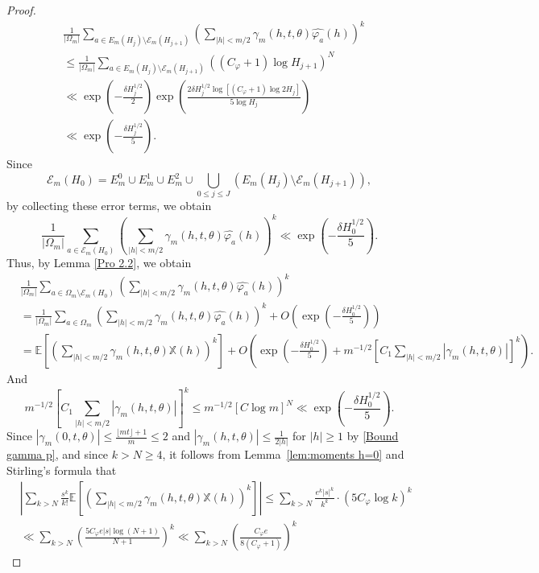 \documentclass[12pt]{amsart}
\theoremstyle{definition}
\numberwithin{equation}{section}
\numberwithin{equation}{section}
\def\E{\mathbb{E}}
\def\Ecal{\mathcal{E}}
\def\Mp{C_\varphi}
\def\X{\mathbb{X}}
\def\E{\mathbb{E}}
\begin{document}
\begin{proof}
\begin{align*}
&\frac{1}{|\Omega_m|}
\sum_{a\in E_m(H_j)\setminus \Ecal_m(H_{j+1})}
\left(
\sum_
{|h|< m/2}
\gamma_m(h,t,\theta)\widehat{\varphi_a}(h)
\right)^k\\
&\leq \frac{1}{|\Omega_m|}
\sum_{a\in E_m(H_j)\setminus \Ecal_m(H_{j+1})}
\left(
(\Mp+1)\log H_{j+1}
\right)^N\\
&\ll 
\exp\left(-\frac{\delta H_j^{1/2}}{2}\right)
\exp\left(\frac{2\delta H_j^{1/2}\log[(\Mp +1)\log 2H_{j}]}{5\log H_j}\right)\\
&\ll \exp\left(-\frac{\delta H_j^{1/2}}{5}\right).
\end{align*}
Since 
\[ 
\Ecal_m(H_0) = E^0_m\cup E^1_m\cup E^2_m\cup
\bigcup_{0 \leq  j\leq J}
\left(E_m(H_j)\setminus \Ecal_m(H_{j+1})\right),
\] 
by collecting these error terms, we obtain
\[
\frac{1}{|\Omega_m|}
\sum_{a\in \Ecal_m(H_0)}
\left(
\sum_
{|h|< m/2}
\gamma_m(h,t,\theta)\widehat{\varphi_a}(h)
\right)^k
\ll \exp\left(-\frac{\delta H_0^{1/2}}{5}\right).
\]
Thus, by Lemma \ref{Pro 2.2}, we obtain
\begin{align*}
&\frac{1}{|\Omega_m|}
\sum_{a\in \Omega_m \setminus \Ecal_m(H_0)}
\left(
\sum_{|h|< m/2}
\gamma_m(h,t,\theta)\widehat{\varphi_a}(h)
\right)^k\\
&=
\frac{1}{|\Omega_m|}
\sum_{{a\in \Omega_m}}
\left(
\sum_{|h|< m/2}
\gamma_m(h,t,\theta)\widehat{\varphi_a}(h)
\right)^k
+ O \left(\exp\left(-\frac{\delta H_0^{1/2}}{5}\right)\right)\\
&= \E
\left[
\left(
\sum_{|h|< m/2}
\gamma_m(h,t,\theta)\X (h)
\right)^k\right]
+ O\left( \exp\left(-\frac{\delta H_0^{1/2}}{5}\right)+m^{-1/2}
\left[C_1 \sum_{|h|<m/2}|\gamma_m(h,t,\theta)|\right]^{k}\right).   
\end{align*}
And
\[m^{-1/2}
\left[C_1\sum_{|h|<m/2}|\gamma_m(h,t,\theta)|\right]^{k}
\leq 
m^{-1/2}
\left[C\log m\right]^{N}
\ll
\exp\left(-\frac{\delta H_0^{1/2}}{5}\right)
.\]
Since $|\gamma_m(0,t,\theta)|\leq\frac{\lfloor mt\rfloor+1}{m}\leq 2$ and
$|\gamma_m(h,t,\theta)|\leq\frac{1}{2|h|}$ for $|h|\geq1$ by \eqref{Bound gamma p},
and since $k>N\geq 4$, it follows from Lemma~\ref{lem:moments h=0} and Stirling's
formula that
\begin{align*}
    &
    \left| 
    \sum_{k>N} 
\frac{s^k}{k!}
\E
\left[\left(
\sum_{|h|< m/2}
\gamma_m(h,t,\theta)\X (h)
\right)^k\right] \right| 
\leq \sum_{k>N} \frac{e^k|s|^k}{k^k} \cdot \left( 5 \Mp\log k\right)^k\\
&\ll \sum_{k>N} \left(\frac{5\Mp e|s|\log (N+1)}{N+1}\right)^k 
\ll \sum_{k>N} \left(\frac{\Mp e}{8(\Mp+1)}\right)^k 

\end{align*}
\end{proof}
\end{document}
